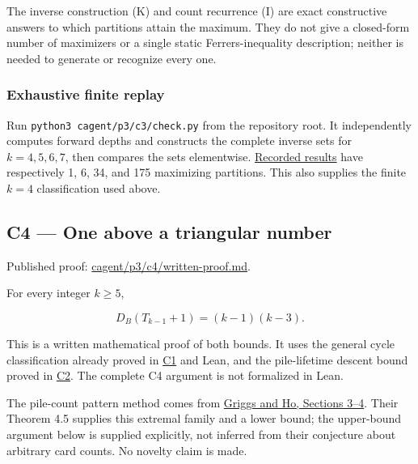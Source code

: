 \documentclass[11pt,a4paper]{article}
\begin{document}
The inverse construction (K) and count recurrence (I) are exact constructive answers to which partitions attain the maximum. They do not give a closed-form number of maximizers or a single static Ferrers-inequality description; neither is needed to generate or recognize every one.

\subsubsection{Exhaustive finite replay}\label{exhaustive-finite-replay}

Run \texttt{python3\ cagent/p3/c3/check.py} from the repository root. It independently computes forward depths and constructs the complete inverse sets for \(k=4,5,6,7\), then compares the sets elementwise. \href{https://github.com/mpelteshki/climbing-to-the-frontier/blob/212bba53b1818c08c40b8c4b48f636651eaf6410/cagent/p3/c3/finite-check.json}{Recorded results} have respectively 1, 6, 34, and 175 maximizing partitions. This also supplies the finite \(k=4\) classification used above.

\subsection{C4 --- One above a triangular number}\label{c4-one-above-a-triangular-number}

Published proof: \href{https://github.com/mpelteshki/climbing-to-the-frontier/blob/212bba53b1818c08c40b8c4b48f636651eaf6410/cagent/p3/c4/written-proof.md}{cagent/p3/c4/written-proof.md}.

For every integer \(k\ge5\),

\[
D_B(T_{k-1}+1)=(k-1)(k-3).
\]

This is a written mathematical proof of both bounds. It uses the general cycle classification already proved in \href{https://github.com/mpelteshki/climbing-to-the-frontier/blob/212bba53b1818c08c40b8c4b48f636651eaf6410/cagent/p3/c1/written-proof.md}{C1} and Lean, and the pile-lifetime descent bound proved in \href{https://github.com/mpelteshki/climbing-to-the-frontier/blob/212bba53b1818c08c40b8c4b48f636651eaf6410/cagent/p3/c2/upper-bound-proof.md}{C2}. The complete C4 argument is not formalized in Lean.

The pile-count pattern method comes from \href{https://sc.edu/study/colleges_schools/artsandsciences/mathematics/research/imi/research/documents/1998/1998_12.pdf}{Griggs and Ho, Sections 3--4}. Their Theorem 4.5 supplies this extremal family and a lower bound; the upper-bound argument below is supplied explicitly, not inferred from their conjecture about arbitrary card counts. No novelty claim is made.
\end{document}
